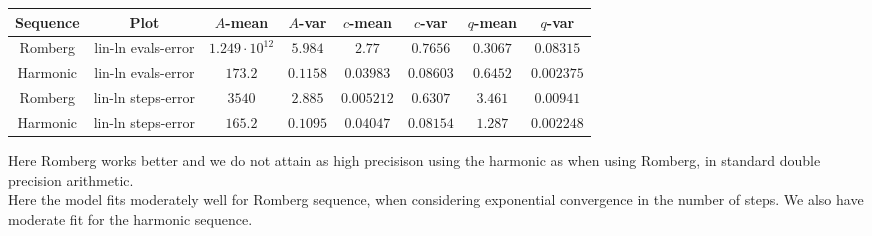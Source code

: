 \begin{table}[H]
    \centering
    \small
     \begin{tabular}{c|c||c|c|c|c|c|c}
Sequence & Plot & \(A\)-mean & \(A\)-var & \(c\)-mean & \(c\)-var & \(q\)-mean & \(q\)-var\\\hline
Romberg & lin-ln evals-error & \(1.249\cdot 10^{12}\) & \(5.984\) & \(2.77\) & \(0.7656\) & \(0.3067\) & \(0.08315\) \\
Harmonic & lin-ln evals-error & \(173.2\) & \(0.1158\) & \(0.03983\) & \(0.08603\) & \(0.6452\) & \(0.002375\) \\
Romberg & lin-ln steps-error & \(3540\) & \(2.885\) & \(0.005212\) & \(0.6307\) & \(3.461\) & \(0.00941\) \\
Harmonic & lin-ln steps-error & \(165.2\) & \(0.1095\) & \(0.04047\) & \(0.08154\) & \(1.287\) & \(0.002248\) \\
    \end{tabular}
    \label{tab:my_label}
\end{table}

Here Romberg works better and we do not attain as high precisison using the harmonic as when using Romberg, in standard double precision arithmetic.\\

Here the model fits moderately well for Romberg sequence, when considering exponential convergence in the number of steps. We also have moderate fit for the harmonic sequence.

